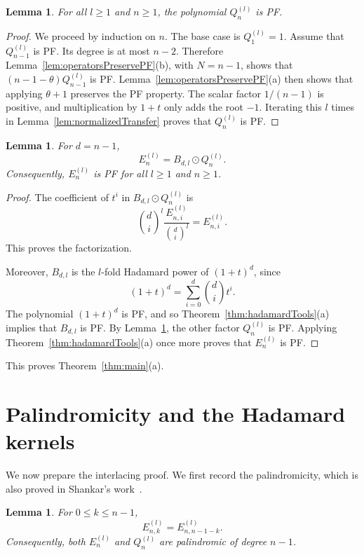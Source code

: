 \documentclass[reqno]{amsart}
\numberwithin{equation}{section}
\newtheorem{lemma}[theorem]{Lemma}
\theoremstyle{definition}
\newcommand{\had}{\odot}
\begin{document}
\begin{lemma}
\label{lem:normalizedRowsPF}
For all $l\geq 1$ and $n\geq 1$, the polynomial $Q_n^{(l)}$ is PF.
\end{lemma}

\begin{proof}
We proceed by induction on $n$.  The base case is $Q_1^{(l)}=1$.  Assume
that $Q_{n-1}^{(l)}$ is PF.  Its degree is at most $n-2$.  Therefore
Lemma~\ref{lem:operatorsPreservePF}(b), with $N=n-1$, shows that
$(n-1-\theta)Q_{n-1}^{(l)}$ is PF.  Lemma~\ref{lem:operatorsPreservePF}(a)
then shows that applying $\theta+1$ preserves the PF property.  The scalar
factor $1/(n-1)$ is positive, and multiplication by $1+t$ only adds the root
$-1$.  Iterating this $l$ times in
Lemma~\ref{lem:normalizedTransfer} proves that $Q_n^{(l)}$ is PF.
\end{proof}

\begin{lemma}
\label{lem:rowHadamardFactorization}
For $d=n-1$,
\[
  E_n^{(l)}=B_{d,l}\had Q_n^{(l)}.
\]
Consequently, $E_n^{(l)}$ is PF for all $l\geq 1$ and $n\geq 1$.
\end{lemma}

\begin{proof}
The coefficient of $t^i$ in $B_{d,l}\had Q_n^{(l)}$ is
\[
  \binom di^l\frac{E_{n,i}^{(l)}}{\binom di^l}
  =
  E_{n,i}^{(l)}.
\]
This proves the factorization.

Moreover, $B_{d,l}$ is the $l$-fold Hadamard power of $(1+t)^d$, since
\[
  (1+t)^d=\sum_{i=0}^{d}\binom di t^i.
\]
The polynomial $(1+t)^d$ is PF, and so
Theorem~\ref{thm:hadamardTools}(a) implies that $B_{d,l}$ is PF.  By
Lemma~\ref{lem:normalizedRowsPF}, the other factor $Q_n^{(l)}$ is PF.
Applying Theorem~\ref{thm:hadamardTools}(a) once more proves that
$E_n^{(l)}$ is PF.
\end{proof}

This proves Theorem~\ref{thm:main}(a).

\section{Palindromicity and the Hadamard kernels}
\label{sec:kernels}

We now prepare the interlacing proof.  We first record the palindromicity,
which is also proved in Shankar's work~\cite{Shankar2025SuperRecurrence}.

\begin{lemma}
\label{lem:palindromic}
For $0\leq k\leq n-1$,
\[
  E_{n,k}^{(l)}=E_{n,n-1-k}^{(l)}.
\]
Consequently, both $E_n^{(l)}$ and $Q_n^{(l)}$ are palindromic of degree
$n-1$.
\end{lemma}
\end{document}
